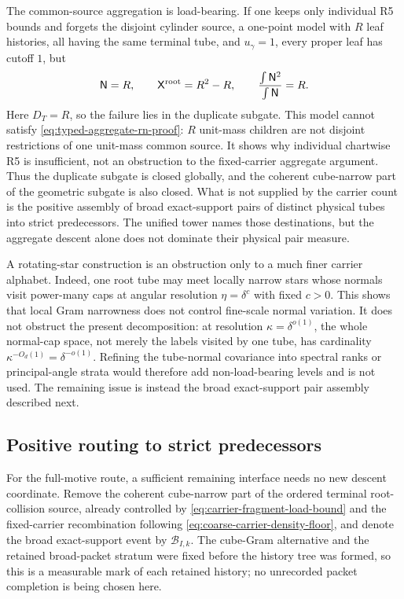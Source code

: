 \documentclass[11pt]{article}
\begin{document}
The common-source aggregation is load-bearing.  If one keeps only individual
R5 bounds and forgets the disjoint cylinder source, a one-point model with
\(R\) leaf histories, all
having the same terminal tube, and \(u_\gamma=1\), every proper leaf has cutoff
\(1\), but
\[
 \mathsf N=R,\qquad
 \mathsf X^{\rm root}=R^2-R,\qquad
 \frac{\int\mathsf N^2}{\int\mathsf N}=R.
\]
Here \(D_T=R\), so the failure lies in the duplicate subgate.  This model
cannot satisfy \eqref{eq:typed-aggregate-rn-proof}: \(R\) unit-mass children
are not disjoint restrictions of one unit-mass common source.  It shows why
individual chartwise R5 is insufficient, not an obstruction to the
fixed-carrier aggregate argument.
Thus the duplicate subgate is closed globally, and the coherent cube-narrow
part of the geometric subgate is also closed.  What is not supplied by the
carrier count is the positive assembly of broad exact-support pairs of
distinct physical tubes into strict predecessors.  The unified tower names
those destinations, but the aggregate descent alone does not dominate their
physical pair measure.

A rotating-star construction is an obstruction only to a much finer carrier
alphabet.  Indeed, one root tube may meet locally narrow stars whose normals
visit power-many caps at angular resolution \(\eta=\delta^c\) with fixed
\(c>0\).  This shows that local Gram narrowness does not control fine-scale
normal variation.  It does not obstruct the present decomposition: at
resolution \(\kappa=\delta^{o(1)}\), the whole normal-cap space, not merely the
labels visited by one tube, has cardinality \(\kappa^{-O_d(1)}
=\delta^{-o(1)}\).  Refining the tube-normal covariance into spectral ranks or
principal-angle strata would therefore add non-load-bearing levels and is not
used.  The remaining issue is instead the broad exact-support pair assembly
described next.
\subsection{Positive routing to strict predecessors}

For the full-motive route, a sufficient remaining interface needs no new
descent coordinate.  Remove the coherent cube-narrow part of the ordered
terminal root-collision source, already controlled by
\eqref{eq:carrier-fragment-load-bound} and the fixed-carrier recombination
following \eqref{eq:coarse-carrier-density-floor}, and denote the broad
exact-support event by \(\mathscr B_{I,k}\).  The cube-Gram alternative and
the retained broad-packet stratum were fixed before the history tree was
formed, so this is a measurable mark of each retained history; no unrecorded
packet completion is being chosen here.
\end{document}
